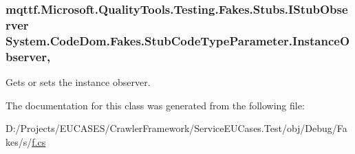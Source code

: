 \hypertarget{class_system_1_1_code_dom_1_1_fakes_1_1_stub_code_type_parameter_ab6c7327e393467d1388fa0d4503e0aed}{
\subsubsection[{Instance\-Observer}]{\setlength{\rightskip}{0pt plus 5cm}mqttf.\-Microsoft.\-Quality\-Tools.\-Testing.\-Fakes.\-Stubs.\-I\-Stub\-Observer System.\-Code\-Dom.\-Fakes.\-Stub\-Code\-Type\-Parameter.\-Instance\-Observer\hspace{0.3cm}{\ttfamily [get]}, {\ttfamily [set]}}}\label{class_system_1_1_code_dom_1_1_fakes_1_1_stub_code_type_parameter_ab6c7327e393467d1388fa0d4503e0aed}


Gets or sets the instance observer.



The documentation for this class was generated from the following file\-:\begin{DoxyCompactItemize}
\item 
D\-:/\-Projects/\-E\-U\-C\-A\-S\-E\-S/\-Crawler\-Framework/\-Service\-E\-U\-Cases.\-Test/obj/\-Debug/\-Fakes/s/\hyperlink{s_2f_8cs}{f.\-cs}\end{DoxyCompactItemize}

